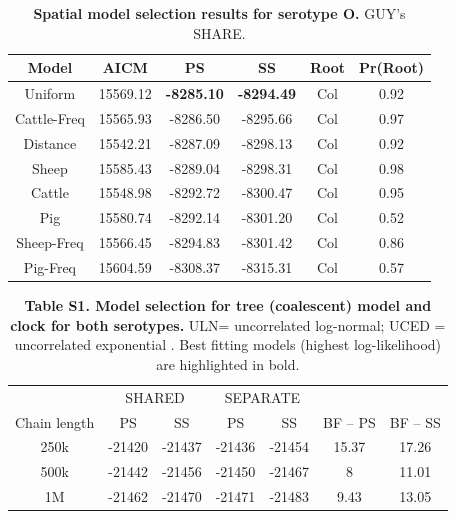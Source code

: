 \documentclass[10pt]{article}
\begin{document}
\begin{table}[!ht]
\caption{
\textbf{Spatial model selection results for serotype O. } GUY's SHARE.}
\begin{tabular}{cccccc}
\toprule
Model	&AICM	&PS	&SS	&Root	&Pr(Root)\\
\midrule
Uniform	&15569.12	&\textbf{-8285.10}	&\textbf{-8294.49}	&Col	&0.92\\
Cattle-Freq	&15565.93	&-8286.50	&-8295.66	&Col	&0.97\\
Distance	&15542.21	&-8287.09	&-8298.13	&Col	&0.92\\
Sheep	&15585.43	&-8289.04	&-8298.31	&Col	&0.98\\
Cattle	&15548.98	&-8292.72	&-8300.47	&Col	&0.95\\
Pig	&15580.74	&-8292.14	&-8301.20	&Col	&0.52\\
Sheep-Freq	&15566.45	&-8294.83	&-8301.42	&Col	&0.86\\
Pig-Freq	&15604.59	&-8308.37	&-8315.31	&Col	&0.57\\
\bottomrule
\end{tabular}
\begin{flushleft}
\end{flushleft}
\label{tab:prootO}
 \end{table}
\newpage
\begin{table}[!ht]
\caption*{\textbf{Table S1. Model selection for tree (coalescent) model and clock for both serotypes.}  ULN= uncorrelated log-normal; UCED = uncorrelated exponential . Best fitting models (highest log-likelihood) are highlighted in bold.}
\begin{tabular}{ccccccc}
	\toprule
        &\multicolumn{2}{c}{SHARED} & \multicolumn{2}{c}{SEPARATE} & & \\
Chain length	&PS	&SS	&PS	&SS	&BF -- PS	&BF -- SS\\
\midrule
250k	&-21420	&-21437	&-21436	&-21454	&15.37	&17.26\\
500k	&-21442	&-21456	&-21450	&-21467	&8	&11.01\\
1M	&-21462	&-21470	&-21471	&-21483	&9.43	&13.05\\
\bottomrule
\end{tabular}
\begin{flushleft}
\end{flushleft}
\label{tab:sharedsep}
 \end{table}
\end{document}

